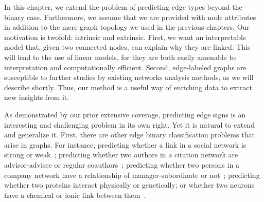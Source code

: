 In this chapter, we extend the problem of predicting edge types beyond the binary case.
Furthermore, we assume that we are provided with node attributes in addition to the mere graph
topology we used in the previous chapters. Our motivation is twofold: intrinsic and extrinsic.
First, we want an interpretable model that, given two connected nodes, can explain why they are
linked. This will lead to the use of linear models, for they are both easily amenable to
interpretation and computationally efficient. Second, edge-labeled graphs are susceptible to further
studies by existing networks analysis methods, as we will describe shortly. Thus, our method is a
useful way of enriching data to extract new insights from it.

As demonstrated by our prior extensive coverage, predicting edge signs is an interesting and
challenging problem in its own right. Yet it is natural to extend and generalize it.  First, there
are other edge binary classification problems that arise in graphs. For instance, predicting whether
a link in a social network is strong or weak~\autocites{communityWeakTies14}{communityWeakTies17};
predicting whether two authors in a citation network are advisor-advisee or regular
coauthors~\autocite{Advisor10}; predicting whether two persons in a company network have a
relationship of manager-subordinate or not~\autocite{Manager07}; predicting whether two proteins
interact physically or genetically; or whether two neurons have a chemical or ionic link between
them~\autocite{BioMultiplex15}.


